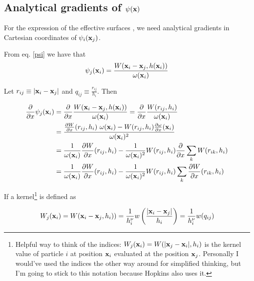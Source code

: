 \subsection{Analytical gradients of $\psi(\mathbf{x})$}

For the \cite{ivanovaCommonEnvelopeEvolution2013} expression of the effective surfaces \Aij, we need analytical gradients in Cartesian coordinates of $\psi_i(\mathbf{x}_j)$.

From eq. \ref{psi} we have that
\begin{align*}
	\psi_j(\mathbf{x}_i) &= \frac{ W(\mathbf{x}_i - \mathbf{x}_j, h(\mathbf{x}_i))}{\omega(\mathbf{x}_i)}\\
\end{align*}

Let $r_{ij} \equiv |\mathbf{x}_i - \mathbf{x}_j|$ and $q_{ij} \equiv \frac{r_{ij}}{h_i}$. Then

\begin{align}
	\deldx \psi_j(\x_i) 	&= \deldx \frac{ W(\x_i - \x_j, h(\x_i))}{\omega(\x_i)} 
							=  \deldx \frac{ W(r_{ij}, h_i)}{\omega(\x_i)}		\nonumber \\
%
							&= \frac{ 
									\DELDX{W}(r_{ij}, h_i) \  \omega(\x_i) -
									W(r_{ij}, h_i) \DELDX{\omega}(\x_i)
									}{\omega(\x_i)^2}		\nonumber  \\
%
							&= \frac{1}{\omega(\x_i)} \DELDX{W}(r_{ij}, h_i) -
							\frac{1}{\omega(\x_i)^2} W(r_{ij}, h_i) \DELDX{}\sum_k W(r_{ik}, h_i)		\nonumber \\
%
							&= \frac{1}{\omega(\x_i)} \DELDX{W}(r_{ij}, h_i) -
									\frac{1}{\omega(\x_i)^2} W(r_{ij}, h_i) \sum_k \DELDX{W}(r_{ik}, h_i)	\label{grad_psi}
\end{align}






If a kernel\footnote{
Helpful way to think of the indices: $W_j(\mathbf{x}_i) = W(|\mathbf{x}_j - \mathbf{x}_i|, h_i)$ is the kernel value of particle $i$ at position $\mathbf{x}_i$ evaluated at the position $\mathbf{x}_j$.
Personally I would've used the indices the other way around for simplified thinking, but I'm going to stick to this notation because Hopkins also uses it.
}
is defined as

\begin{align*}
	W_j(\mathbf{x}_i)	 = W(\mathbf{x}_i - \mathbf{x}_j, h_i))
				 = \frac{1}{h_i^\nu} w \left(\frac{| \mathbf{x}_i - \mathbf{x}_j |}{h_i} \right)
				 =  \frac{1}{h_i^\nu} w ( q_{ij} )
\end{align*}





